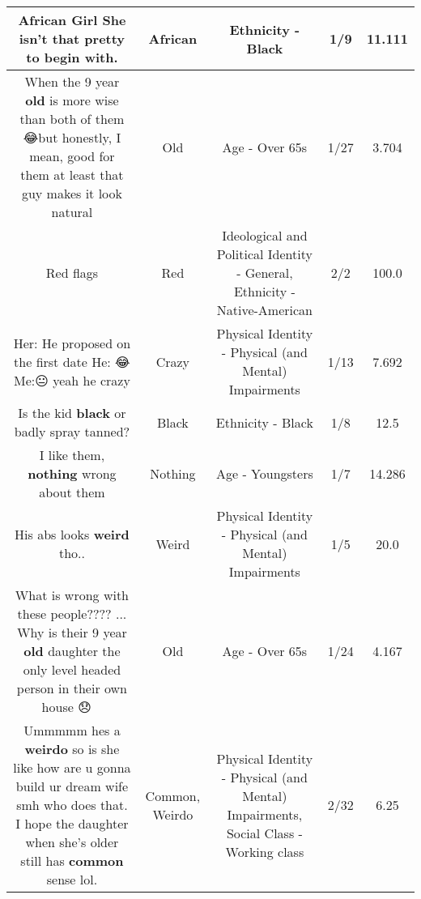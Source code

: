\documentclass[11pt]{article}
\newlength\mylength
\begin{document}
\begin{center}
\begin{longtable}{|C{.65\mylength}|C{.30\mylength}|C{.12\mylength}|C{.12\mylength}|C{.12\mylength}|}
  \small African Girl She isn't that pretty to begin with.\normalsize   & African & Ethnicity - Black & 1/9 & 11.111 \\  \hline
  \small When the 9 year \textbf{old} is more wise than both of them 😂but honestly, I mean, good for them at least that guy makes it look natural\normalsize   & Old & Age - Over 65s & 1/27 & 3.704 \\  \hline
  \small Red flags\normalsize   & Red &  Ideological and Political Identity - General, Ethnicity - Native-American & 2/2 & 100.0 \\  \hline
  \small Her: He proposed on the first date He: 😂Me:😐 yeah he crazy\normalsize   & Crazy & Physical Identity - Physical (and Mental) Impairments & 1/13 & 7.692 \\  \hline
  \small Is the kid \textbf{black} or badly spray tanned?\normalsize   & Black & Ethnicity - Black & 1/8 & 12.5 \\  \hline
  \small I like them, \textbf{nothing} wrong about them\normalsize   & Nothing & Age - Youngsters & 1/7 & 14.286 \\  \hline
  \small His abs looks \textbf{weird} tho..\normalsize   & Weird & Physical Identity - Physical (and Mental) Impairments & 1/5 & 20.0 \\  \hline
  \small What is wrong with these people???? ... Why is their 9 year \textbf{old} daughter the only level headed person in their own house 😞🤦🏾‍♀️\normalsize   & Old & Age - Over 65s & 1/24 & 4.167 \\  \hline
  \small Ummmmm hes a \textbf{weirdo} so is she like how are u gonna build ur dream wife smh who does that. I hope the daughter when she's older still has \textbf{common} sense lol.\normalsize   & Common, Weirdo & Physical Identity - Physical (and Mental) Impairments, Social Class - Working class & 2/32 & 6.25 \\  \hline

\end{longtable}
\end{center}
\end{document}
